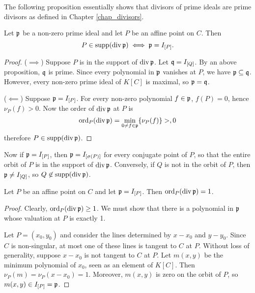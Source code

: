 The following proposition essentially shows that divisors of prime ideals are prime divisors as defined in Chapter \ref{chap_divisors}.
\begin{proposition}
  Let $\frak p$ be a non-zero prime ideal and let $P$ be an affine point on $C$. Then
  \[ P \in \supp(\div \frak p) \iff \frak p = I_{[P]}. \]
\end{proposition}
\begin{proof}
  ($\implies$)
  Suppose $P$ is in the support of $\div \frak p$.
  Let $\frak q = I_{[Q]}$.
  By an above proposition, $\frak q$ is prime.
  Since every polynomial in $\frak p$ vanishes at $P$, we have $\frak p \subseteq \frak q$.
  However, every non-zero prime ideal of $K[C]$ is maximal, so $\frak p = \frak q$.
  
  ($\impliedby$)
  Suppose $\frak p = I_{[P]}$.
  For every non-zero polynomial $f \in \frak p$, $f(P) = 0$, hence $\nu_P(f) > 0$.
  Now the order of $\div \frak p$ at $P$ is
  \[ \ord_P(\div \frak p) = \min_{0 \neq f \in \frak p}\{ \nu_P(f) \} > ,0 \]
  therefore $P \in \supp(\div \frak p)$.
\end{proof}

Now if $\frak p = I_{[P]}$, then $\frak p = I_{[\sigma(P)]}$ for every conjugate point of $P$,
so that the entire orbit of $P$ is in the support of $\div \frak p$.
Conversely, if $Q$ is not in the orbit of $P$, then $\frak p \neq I_{[Q]}$, so $Q \not\in \supp(\div \frak p)$.

\begin{lemma}
  \label{lem_order_is_1}
  Let $P$ be an affine point on $C$ and let $\frak p = I_{[P]}$.
  Then $\ord_P(\div \frak p) = 1$.
\end{lemma}
\begin{proof}
  Clearly, $\ord_P(\div \frak p) \geq 1$.
  We must show that there is a polynomial in $\frak p$ whose valuation at $P$ is exactly 1.
  
  Let $P = (x_0, y_0)$ and consider the lines determined by $x - x_0$ and $y - y_0$.
  Since $C$ is non-singular, at most one of these lines is tangent to $C$ at $P$.
  Without loss of generality, suppose $x - x_0$ is not tangent to $C$ at $P$.
  Let $m(x, y)$ be the minimum polynomial of $x_0$, seen as an element of $K[C]$.
  Then $\nu_P(m) = \nu_P(x - x_0) = 1$.
  Moreover, $m(x, y)$ is zero on the orbit of $P$,
  so $m(x, y) \in I_{[P]} = \frak p$.
\end{proof}

